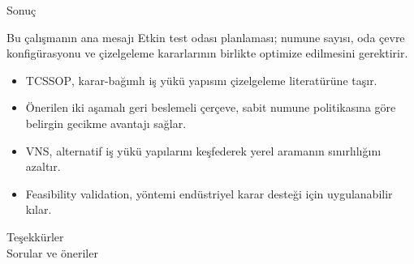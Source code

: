 \documentclass[aspectratio=169,11pt]{beamer}
\newcommand{\tcssop}{\textsc{TCSSOP}}
\begin{document}
\begin{frame}{Sonuç}
  \begin{block}{Bu çalışmanın ana mesajı}
    Etkin test odası planlaması; numune sayısı, oda çevre konfigürasyonu ve çizelgeleme kararlarının birlikte optimize edilmesini gerektirir.
  \end{block}

  \begin{itemize}
    \item \tcssop, karar-bağımlı iş yükü yapısını çizelgeleme literatürüne taşır.
    \item Önerilen iki aşamalı geri beslemeli çerçeve, sabit numune politikasına göre belirgin gecikme avantajı sağlar.
    \item VNS, alternatif iş yükü yapılarını keşfederek yerel aramanın sınırlılığını azaltır.
    \item Feasibility validation, yöntemi endüstriyel karar desteği için uygulanabilir kılar.
  \end{itemize}
\end{frame}

\begin{frame}
  \centering
  \vfill
  {\Huge Teşekkürler}\\[4mm]
  {\large Sorular ve öneriler}
  \vfill
\end{frame}
\end{document}
